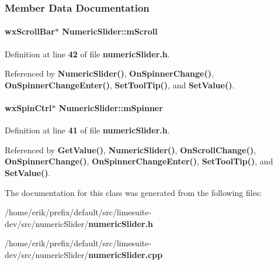 \subsubsection{Member Data Documentation}
\paragraph[{m\+Scroll}]{\setlength{\rightskip}{0pt plus 5cm}wx\+Scroll\+Bar$\ast$ Numeric\+Slider\+::m\+Scroll\hspace{0.3cm}{\ttfamily [protected]}}\label{classNumericSlider_ab88a498e11cf3c5962c53bb061d50937}


Definition at line {\bf 42} of file {\bf numeric\+Slider.\+h}.



Referenced by {\bf Numeric\+Slider()}, {\bf On\+Spinner\+Change()}, {\bf On\+Spinner\+Change\+Enter()}, {\bf Set\+Tool\+Tip()}, and {\bf Set\+Value()}.

\paragraph[{m\+Spinner}]{\setlength{\rightskip}{0pt plus 5cm}wx\+Spin\+Ctrl$\ast$ Numeric\+Slider\+::m\+Spinner\hspace{0.3cm}{\ttfamily [protected]}}\label{classNumericSlider_a34b93565eb697f3f6f0d07cae8dc74f0}


Definition at line {\bf 41} of file {\bf numeric\+Slider.\+h}.



Referenced by {\bf Get\+Value()}, {\bf Numeric\+Slider()}, {\bf On\+Scroll\+Change()}, {\bf On\+Spinner\+Change()}, {\bf On\+Spinner\+Change\+Enter()}, {\bf Set\+Tool\+Tip()}, and {\bf Set\+Value()}.



The documentation for this class was generated from the following files\+:\begin{DoxyCompactItemize}
\item 
/home/erik/prefix/default/src/limesuite-\/dev/src/numeric\+Slider/{\bf numeric\+Slider.\+h}\item 
/home/erik/prefix/default/src/limesuite-\/dev/src/numeric\+Slider/{\bf numeric\+Slider.\+cpp}\end{DoxyCompactItemize}
